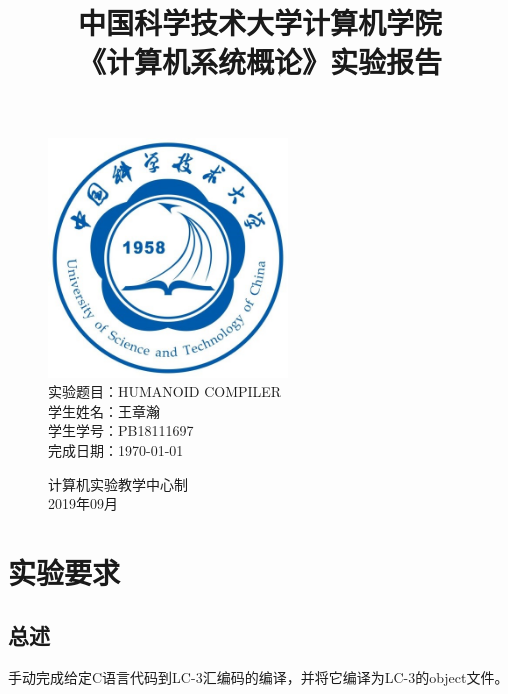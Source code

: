\documentclass[UTF8]{article}
\title{中国科学技术大学计算机学院\\《计算机系统概论》实验报告}
\author{}
\date{}
\begin{document}
\maketitle
\begin{figure}[H]
	\centering
	\includegraphics[width=2.5in]{xiaohui.jpg}\vspace{0.5cm}\\
	\large{
		实验题目：HUMANOID COMPILER\\
		学生姓名：王章瀚\\
		学生学号：PB18111697\\
		完成日期：\today\\
	}\vspace{2cm}
	
	\large{计算机实验教学中心制\\2019年09月\\}
	\thispagestyle{empty}
	\clearpage  %
\end{figure}



\section{实验要求}
\subsection{总述}
手动完成给定C语言代码到LC-3汇编码的编译，并将它编译为LC-3的object文件。
\end{document}
